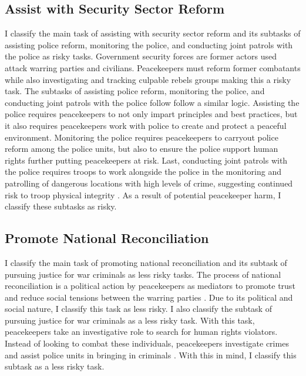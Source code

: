 \subsection*{Assist with Security Sector Reform}

I classify the main task of assisting with security sector reform and its subtasks of assisting police reform, monitoring the police, and conducting joint patrols with the police as risky tasks. Government security forces are former actors used attack warring parties and civilians. Peacekeepers must reform former combatants while also investigating and tracking culpable rebels groups \citep{lloyd_diss} making this a risky task. The subtasks of assisting police reform, monitoring the police, and conducting joint patrols with the police follow follow a similar logic. Assisting the police requires peacekeepers to not only impart principles and best practices, but it also requires peacekeepers work with police to create and protect a peaceful environment. Monitoring the police requires peacekeepers to carryout police reform among the police units, but also to ensure the police support human rights further putting peacekeepers at risk. Last, conducting joint patrols with the police requires troops to work alongside the police in the monitoring and patrolling of dangerous locations with high levels of crime, suggesting continued risk to troop physical integrity \citep{TAMM_Codebook}. As a result of potential peacekeeper harm, I classify these subtasks as risky. 

\subsection*{Promote National Reconciliation}

I classify the main task of promoting national reconciliation and its subtask of pursuing justice for war criminals as less risky tasks. The process of national reconciliation is a political action by peacekeepers as mediators to promote trust and reduce social tensions between the warring parties \citep{Pol_Sol}. Due to its political and social nature, I classify this task as less risky. I also classify the subtask of pursuing justice for war criminals as a less risky task. With this task, peacekeepers take an investigative role to search for human rights violators. Instead of looking to combat these individuals, peacekeepers investigate crimes and assist police units in bringing in criminals \citep{TAMM_Codebook}. With this in mind, I classify this subtask as a less risky task. 

